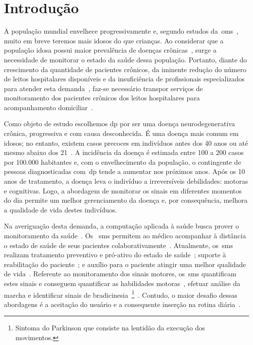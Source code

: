 \chapter{Introdu\c{c}\~{a}o} \label{chapter:intro}

A população mundial envelhece progressivamente e, segundo estudos da~\ac{oms}~\cite{ageing2011}, muito em breve teremos mais idosos do que crianças. Ao considerar que a população idosa possui maior prevalência de doenças crônicas~\cite{prevcronica2009}, surge a necessidade de monitorar o estado da saúde dessa população. Portanto, diante do crescimento da quantidade de pacientes crônicos, da iminente redução do número de leitos hospitalares disponíveis e da insuficiência de profissionais especializados para atender esta demanda~\cite{healthmonitoring2013}, faz-se necessário transpor serviços de monitoramento dos pacientes crônicos dos leitos hospitalares para acompanhamento domiciliar~\cite{homecarebrazil2011}. 

Como objeto de estudo escolhemos \ac{dp} por ser uma doença neurodegenerativa crônica, progressiva e com causa desconhecida. É uma doença mais comum em idosos; no entanto, existem casos precoces em indivíduos antes dos 40 anos ou até mesmo abaixo dos 21~\cite{menezes2003}. A incidência da doença é estimada entre 100 a 200 casos por 100.000 habitantes e, com o envelhecimento da população, o contingente de pessoas diagnosticadas com~\ac{dp} tende a aumentar nos próximos anos. Após os 10 anos de tratamento, a doença leva o indivíduo a irreversíveis debilidades: motoras e cognitivas. Logo, a abordagem de monitorar os sinais em diferentes momentos do dia permite um melhor gerenciamento da doença e, por consequência, melhora a qualidade de vida destes indivíduos.

Na averiguação desta demanda, a computação aplicada à saúde busca prover o monitoramento da saúde~\cite{healthmonitoring2013,berg03,bardram2010,aarhus_negotiating_2010}. Os ~\ac{sms} permitem ao médico acompanhar à distância o estado de saúde de seus pacientes colaborativamente~\cite{healthmonitoring2013}. Atualmente, os~\ac{sms} realizam tratamento preventivo e pró-ativo do estado de saúde~\cite{bardram2010}; suporte à reabilitação do paciente~\cite{sacbespoke2014}; e auxílio para o paciente atingir uma melhor qualidade de vida~\cite{sacsvmhms2014}. Referente ao monitoramento dos sinais motores, os~\ac{sms} quantificam estes sinais e conseguem quantificar as habilidades motoras~\cite{manumeterjbhi2014,patel_monitoring_2009}, efetuar análise da marcha \cite{robotgait2014} e identificar sinais de bradicinesia~\footnote{Sintoma do Parkinson que consiste na lentidão da execução dos movimentos.}~\cite{ambulatoryparkinson2010}. Contudo, o maior desafio dessas abordagens é a aceitação do usuário e a consequente inserção na rotina diária~\cite{alemdar2015}.

